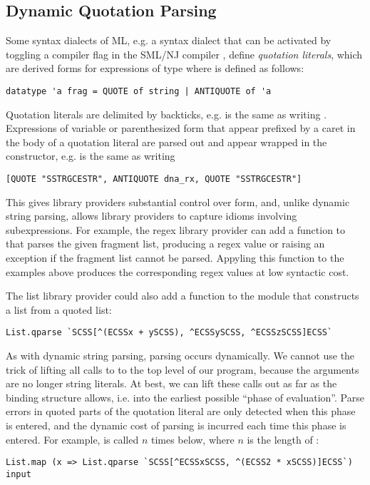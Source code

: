 \subsection{Dynamic Quotation Parsing}\label{sec:dynamic-quotation}
Some syntax dialects of ML, e.g. a syntax dialect that can be activated by toggling a compiler flag in the SML/NJ compiler \cite{SML/Quote}, define \emph{quotation literals}, which are derived forms for expressions of type  where  is defined as follows:
\begin{lstlisting}[numbers=none]
datatype 'a frag = QUOTE of string | ANTIQUOTE of 'a
\end{lstlisting}
Quotation literals are delimited by backticks, e.g.  is the same as writing . Expressions of variable or parenthesized form that appear prefixed by a caret in the body of a quotation literal  are parsed out and appear wrapped in the  constructor, e.g.   is the same as writing 
\begin{lstlisting}[numbers=none]
[QUOTE "SSTRGCESTR", ANTIQUOTE dna_rx, QUOTE "SSTRGCESTR"]
\end{lstlisting}
This gives library providers substantial control over form, and, unlike dynamic string parsing, allows library providers to capture idioms involving subexpressions. For example, the regex library provider can add a function  to  that parses the given fragment list,  producing a regex value or raising an exception if the fragment list cannot be parsed. Appyling this function to the examples above produces the corresponding regex values at low syntactic cost.

The list library provider could also add a function  to the  module that constructs a list from a quoted list:
\begin{lstlisting}[numbers=none]
List.qparse `SCSS[^(ECSSx + ySCSS), ^ECSSySCSS, ^ECSSzSCSS]ECSS`
\end{lstlisting}


As with dynamic string parsing, parsing occurs dynamically. We cannot use the trick of lifting all calls to  to the top level of our program, because the arguments are no longer string literals. At best, we can lift these calls out as far as the binding structure allows, i.e. into the earliest possible ``phase of evaluation''. Parse errors in quoted parts of the quotation literal are only detected when this phase is entered, and the dynamic cost of parsing is incurred each time this phase is entered. For example,  is called $n$ times below, where $n$ is the length of :
\begin{lstlisting}[numbers=none]
List.map (x => List.qparse `SCSS[^ECSSxSCSS, ^(ECSS2 * xSCSS)]ECSS`) input
\end{lstlisting}

